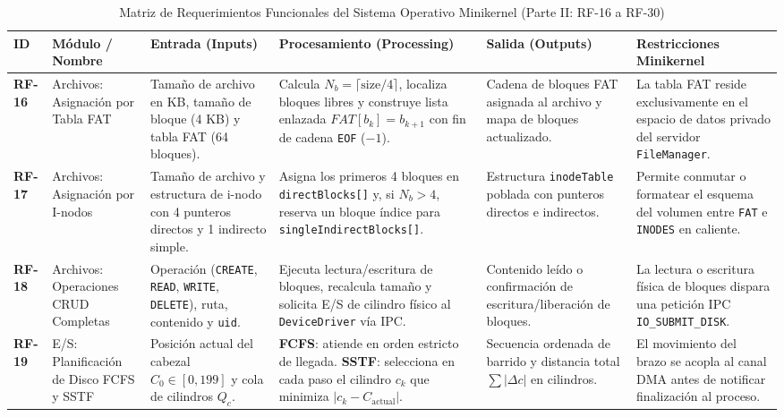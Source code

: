 \documentclass[10pt,twocolumn,letterpaper]{article}
\begin{document}
\begin{table}[!t]
\caption{Matriz de Requerimientos Funcionales del Sistema Operativo Minikernel (Parte II: RF-16 a RF-30)}
\label{tab:rf_parte2}
\centering
\scriptsize
\renewcommand{\arraystretch}{1.18}
\begin{tabularx}{\textwidth}{C{0.9cm} L{2.2cm} L{2.8cm} Y L{2.8cm} L{3.3cm}}
\toprule
\textbf{ID} & \textbf{M\'odulo / Nombre} & \textbf{Entrada (Inputs)} & \textbf{Procesamiento (Processing)} & \textbf{Salida (Outputs)} & \textbf{Restricciones Minikernel} \\
\midrule
\textbf{RF-16} & Archivos: Asignaci\'on por Tabla FAT & Tama\~no de archivo en KB, tama\~no de bloque (4 KB) y tabla FAT (64 bloques). & Calcula $N_b = \lceil \text{size}/4 \rceil$, localiza bloques libres y construye lista enlazada $FAT[b_k] = b_{k+1}$ con fin de cadena \texttt{EOF} ($-1$). & Cadena de bloques FAT asignada al archivo y mapa de bloques actualizado. & La tabla FAT reside exclusivamente en el espacio de datos privado del servidor \texttt{FileManager}. \\
\textbf{RF-17} & Archivos: Asignaci\'on por I-nodos & Tama\~no de archivo y estructura de i-nodo con 4 punteros directos y 1 indirecto simple. & Asigna los primeros 4 bloques en \texttt{directBlocks[]} y, si $N_b > 4$, reserva un bloque \'indice para \texttt{singleIndirectBlocks[]}. & Estructura \texttt{inodeTable} poblada con punteros directos e indirectos. & Permite conmutar o formatear el esquema del volumen entre \texttt{FAT} e \texttt{INODES} en caliente. \\
\textbf{RF-18} & Archivos: Operaciones CRUD Completas & Operaci\'on (\texttt{CREATE}, \texttt{READ}, \texttt{WRITE}, \texttt{DELETE}), ruta, contenido y \texttt{uid}. & Ejecuta lectura/escritura de bloques, recalcula tama\~no y solicita E/S de cilindro f\'isico al \texttt{DeviceDriver} v\'ia IPC. & Contenido le\'ido o confirmaci\'on de escritura/liberaci\'on de bloques. & La lectura o escritura f\'isica de bloques dispara una petici\'on IPC \texttt{IO\_SUBMIT\_DISK}. \\
\textbf{RF-19} & E/S: Planificaci\'on de Disco FCFS y SSTF & Posici\'on actual del cabezal $C_0 \in [0,199]$ y cola de cilindros $Q_c$. & \textbf{FCFS}: atiende en orden estricto de llegada. \textbf{SSTF}: selecciona en cada paso el cilindro $c_k$ que minimiza $|c_k - C_{\text{actual}}|$. & Secuencia ordenada de barrido y distancia total $\sum |\Delta c|$ en cilindros. & El movimiento del brazo se acopla al canal DMA antes de notificar finalizaci\'on al proceso. \\

\end{tabularx}
\end{table}
\end{document}
